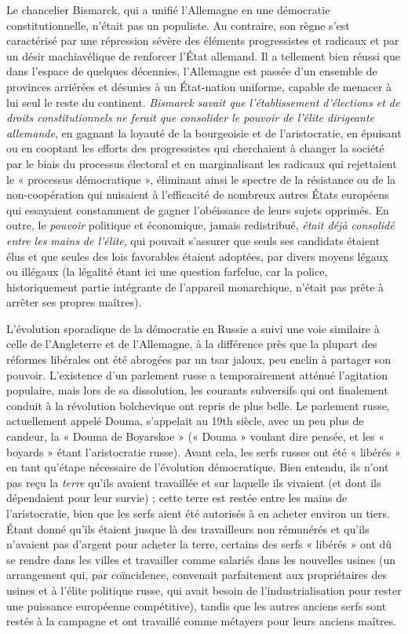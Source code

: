Le chancelier Bismarck, qui a unifié l'Allemagne en une démocratie constitutionnelle, n'était pas un populiste. Au contraire, son règne s'est caractérisé par une répression sévère des éléments progressistes et radicaux et par un désir machiavélique de renforcer l'État allemand. Il a tellement bien réussi que dans l'espace de quelques décennies, l'Allemagne est passée d'un ensemble de provinces arriérées et désunies à un État-nation uniforme, capable de menacer à lui seul le reste du continent. \emph{Bismarck savait que l’établissement d'élections et de droits constitutionnels ne ferait que consolider le pouvoir de l'élite dirigeante allemande}, en gagnant la loyauté de la bourgeoisie et de l'aristocratie, en épuisant ou en cooptant les efforts des progressistes qui cherchaient à changer la société par le biais du processus électoral et en marginalisant les radicaux qui rejettaient le « processus démocratique », éliminant ainsi le spectre de la résistance ou de la non-coopération qui nuisaient à l'efficacité de nombreux autres États européens qui essayaient constamment de gagner l'obéissance de leurs sujets opprimés. En outre, le \emph{pouvoir} politique et économique, jamais redistribué, \emph{était déjà consolidé entre les mains de l'élite}, qui pouvait s'assurer que seuls ses candidats étaient élus et que seules des lois favorables étaient adoptées, par divers moyens légaux ou illégaux (la légalité étant ici une question farfelue, car la police, historiquement partie intégrante de l'appareil monarchique, n'était pas prête à arrêter ses propres maîtres).

L'évolution sporadique de la démocratie en Russie a suivi une voie similaire à celle de l'Angleterre et de l'Allemagne, à la différence près que la plupart des réformes libérales ont été abrogées par un tsar jaloux, peu enclin à partager son pouvoir. L'existence d'un parlement russe a temporairement atténué l'agitation populaire, mais lors de sa dissolution, les courants subversifs qui ont finalement conduit à la révolution bolchevique ont repris de plus belle. Le parlement russe, actuellement appelé Douma, s'appelait au 19th siècle, avec un peu plus de candeur, la « Douma de Boyarskoe » (« Douma » voulant dire pensée, et les « boyards » étant l'aristocratie russe). Avant cela, les serfs russes ont été « libérés » en tant qu'étape nécessaire de l'évolution démocratique. Bien entendu, ils n'ont pas reçu la \emph{terre} qu'ils avaient travaillée et sur laquelle ils vivaient (et dont ils dépendaient pour leur survie) ; cette terre est restée entre les mains de l'aristocratie, bien que les serfs aient été autorisés à en acheter environ un tiers. Étant donné qu'ils étaient jusque là des travailleurs non rémunérés et qu'ils n'avaient pas d'argent pour acheter la terre, certains des serfs « libérés » ont dû se rendre dans les villes et travailler comme salariés dans les nouvelles usines (un arrangement qui, par coïncidence, convenait parfaitement aux propriétaires des usines et à l'élite politique russe, qui avait besoin de l'industrialisation pour rester une puissance européenne compétitive), tandis que les autres anciens serfs sont restés à la campagne et ont travaillé comme métayers pour leurs anciens maîtres.

